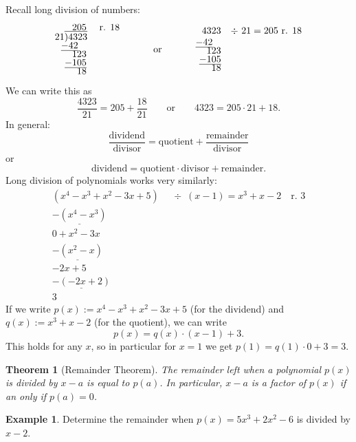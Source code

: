 \documentclass[
  12pt,
  oneside]{book}
\newtheorem{theorem}{Theorem}[chapter]
\theoremstyle{definition}
\theoremstyle{definition}
\newtheorem{example}{Example}[chapter]
\theoremstyle{definition}
\theoremstyle{definition}
\theoremstyle{remark}
\begin{document}
Recall long division of numbers:
\[
\begin{array}{rl}
      205&\text{ r. }18 \\[-3pt]
   21 \overline{){4323}}\kern-.2ex \\[-3pt]
      \underline{-42}\phantom{m}\\[-3pt]
      123 \\[-3pt]
      \underline{-105}\\[-3pt]
      18
  \end{array}
  \quad\quad\quad\text{or}\quad\quad\quad
  \begin{array}{rl}
  4323& \div \,\,21 = 205\text{ r. }18 \\
      \underline{-42}\phantom{m}\\[-3pt]
      123 \\[-3pt]
      \underline{-105}\\[-3pt]
      18
    \end{array}
\]
We can write this as
\[
\frac{4323}{21} = 205+\frac{18}{21}\quad\quad\text{or}\quad\quad
4323 = 205\cdot 21 + 18.
\]
In general:
\[
\frac{\text{dividend}}{\text{divisor}} = \text{quotient} + \frac{\text{remainder}}{\text{divisor}}
\]
or
\[
\text{dividend} = \text{quotient}\cdot\text{divisor} + \text{remainder}.
\]
Long division of polynomials works very similarly:
\[
\begin{array}{rl}
(x^4-x^3+x^2-3x+5)&\div\,\,\, (x-1) = x^3+x-2\quad\text{r. }3\\
\underline{-(x^4 -x^3)}\phantom{+x^2-3x+5)}&\\
0+x^2-3x\phantom{+5x)}\\
\underline{-(x^2-x)}\phantom{+5x)}\\
-2x+5\phantom{m}\\
\underline{-(-2x+2)}\phantom{)}\\
3\phantom{m}
\end{array}
\]
If we write \(p(x):=x^4-x^3+x^2-3x+5\) (for the dividend) and \(q(x):=x^3+x-2\) (for the quotient), we can write
\[
p(x) = q(x)\cdot(x-1) + 3.
\]
This holds for any \(x\), so in particular for \(x=1\) we get \(p(1) = q(1)\cdot0+3=3\).

\begin{theorem}[Remainder Theorem]
The remainder left when a polynomial \(p(x)\) is divided by \(x-a\) is equal to \(p(a)\). In particular, \(x-a\) is a factor of \(p(x)\) if an only if \(p(a)=0\).
\end{theorem}

\begin{example}
Determine the remainder when \(p(x)=5x^3+2x^2-6\) is divided by \(x-2\).
\end{example}
\end{document}
